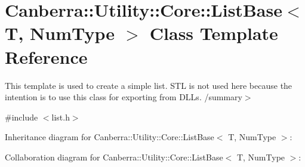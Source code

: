\hypertarget{class_canberra_1_1_utility_1_1_core_1_1_list_base}{}\section{Canberra\+:\+:Utility\+:\+:Core\+:\+:List\+Base$<$ T, Num\+Type $>$ Class Template Reference}
\label{class_canberra_1_1_utility_1_1_core_1_1_list_base}


This template is used to create a simple list. S\+TL is not used here because the intention is to use this class for exporting from D\+LL\textquotesingle{}s. /summary$>$  




{\ttfamily \#include $<$list.\+h$>$}



Inheritance diagram for Canberra\+:\+:Utility\+:\+:Core\+:\+:List\+Base$<$ T, Num\+Type $>$\+:


Collaboration diagram for Canberra\+:\+:Utility\+:\+:Core\+:\+:List\+Base$<$ T, Num\+Type $>$\+:

